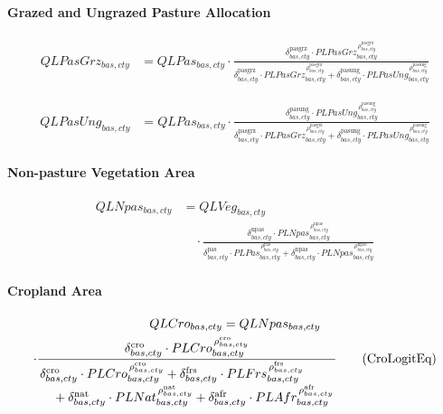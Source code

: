 \paragraph{Grazed and Ungrazed Pasture Allocation}
\begin{align}
  QLPasGrz_{bas,cty}
  &=
    QLPas_{bas,cty}
    \cdot
    \frac{
      \delta^{\text{pasgrz}}_{bas,cty}
      \cdot
      PLPasGrz_{bas,cty}^{\,\rho^{\text{pasgrz}}_{bas,cty}}
    }{
      \delta^{\text{pasgrz}}_{bas,cty}
      \cdot
      PLPasGrz_{bas,cty}^{\,\rho^{\text{pasgrz}}_{bas,cty}}
      +
      \delta^{\text{pasung}}_{bas,cty}
      \cdot
      PLPasUng_{bas,cty}^{\,\rho^{\text{pasung}}_{bas,cty}}
    }
  \tag{PasGrzLogitEq}\label{eq:PasGrzLogitEq}
\end{align}

\begin{align}
  QLPasUng_{bas,cty}
  &=
    QLPas_{bas,cty}
    \cdot
    \frac{
      \delta^{\text{pasung}}_{bas,cty}
      \cdot
      PLPasUng_{bas,cty}^{\,\rho^{\text{pasung}}_{bas,cty}}
    }{
      \delta^{\text{pasgrz}}_{bas,cty}
      \cdot
      PLPasGrz_{bas,cty}^{\,\rho^{\text{pasgrz}}_{bas,cty}}
      +
      \delta^{\text{pasung}}_{bas,cty}
      \cdot
      PLPasUng_{bas,cty}^{\,\rho^{\text{pasung}}_{bas,cty}}
    }
  \tag{PasUngLogitEq}\label{eq:PasUngLogitEq}
\end{align}


\paragraph{Non-pasture Vegetation Area}
\begin{align}
  QLNpas_{bas,cty}
  &=
    QLVeg_{bas,cty}
    \nonumber\\[-0.3em]
  &\quad\cdot
    \frac{
      \delta^{\text{npas}}_{bas,cty}
      \cdot PLNpas_{bas,cty}^{\,\rho^{\text{npas}}_{bas,cty}}
    }{
      \delta^{\text{pas}}_{bas,cty}
      \cdot PLPas_{bas,cty}^{\,\rho^{\text{pas}}_{bas,cty}}
      +
      \delta^{\text{npas}}_{bas,cty}
      \cdot PLNpas_{bas,cty}^{\,\rho^{\text{npas}}_{bas,cty}}
    }
  \tag{NpasLogitEq}\label{eq:NpasLogitEq}
\end{align}

\paragraph{Cropland Area}
\begin{multline}
  QLCro_{bas,cty} = QLNpas_{bas,cty}\\
  \cdot
  \frac{
    \delta^{\text{cro}}_{bas,cty} \cdot PLCro_{bas,cty}^{\,\rho^{\text{cro}}_{bas,cty}}
  }{
    \splitfrac{\delta^{\text{cro}}_{bas,cty} \cdot PLCro_{bas,cty}^{\,\rho^{\text{cro}}_{bas,cty}}
    + \delta^{\text{frs}}_{bas,cty} \cdot PLFrs_{bas,cty}^{\,\rho^{\text{frs}}_{bas,cty}}}
    {+ \delta^{\text{nat}}_{bas,cty} \cdot PLNat_{bas,cty}^{\,\rho^{\text{nat}}_{bas,cty}}
    + \delta^{\text{afr}}_{bas,cty} \cdot PLAfr_{bas,cty}^{\,\rho^{\text{afr}}_{bas,cty}}}
  }
  \tag{CroLogitEq}\label{eq:CroLogitEq}
\end{multline}

